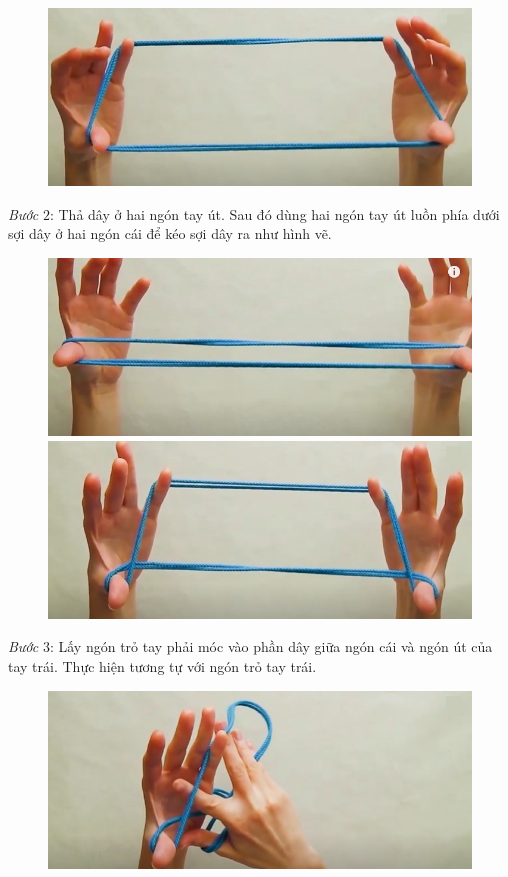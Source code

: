 \begin{multicols}{2}
\begin{figure}[H]
		\vspace*{1pt}
		\hspace*{1pt}\includegraphics[width=0.82\linewidth]{1c}
	\end{figure}
	\textit{Bước} $2$: Thả dây ở hai ngón tay út. Sau đó dùng hai ngón tay út luồn phía dưới sợi dây ở hai ngón cái để kéo sợi dây ra như hình vẽ.
	\begin{figure}[H]
		\vspace*{-5pt}
		\centering
		\captionsetup{labelformat= empty, justification=centering}
		\includegraphics[width=0.8\linewidth]{2a}

		\vspace*{1pt}
		\includegraphics[width=0.8\linewidth]{2b}
		\vspace*{-10pt}
	\end{figure}
	\textit{Bước} $3$: Lấy ngón trỏ tay phải móc vào phần dây giữa ngón cái và ngón út của tay trái. Thực hiện tương tự với ngón trỏ tay trái.
	\begin{figure}[H]
		\vspace*{-5pt}
		\centering
		\captionsetup{labelformat= empty, justification=centering}
		\includegraphics[width=0.8\linewidth]{3a}
		

\end{figure}
\end{multicols}
